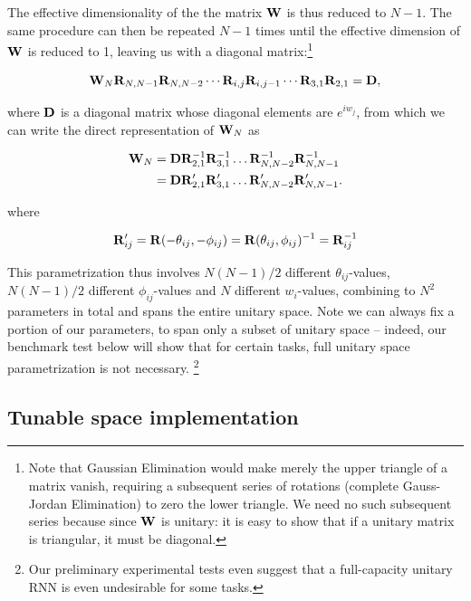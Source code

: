 The effective dimensionality of the the matrix ${\bf W}$ is thus reduced to $N-1$. The same procedure can then be repeated $N-1$ times until the effective dimension of ${\bf W}$ is reduced to 1, leaving us with a diagonal matrix:\footnote{Note that Gaussian Elimination would make merely the upper triangle of a matrix vanish, requiring a subsequent series of rotations (complete Gauss-Jordan Elimination) to zero the lower triangle. We need no such subsequent series because since ${\bf W}$ is unitary: it is easy to show that if a unitary matrix is triangular, it must be diagonal.}

\begin{equation}
{\bf W}_N{\bf R}_{N,N-1}{\bf R}_{N,N-2}\cdots{\bf R}_{i,j}{\bf R}_{i,j-1}\cdots{\bf R}_{3,1}{\bf R}_{2,1} = {\bf D},
\end{equation}

where ${\bf D}$ is a diagonal matrix whose diagonal elements are $e^{iw_j}$, from which we can write the direct representation of ${\bf W}_N$ as

\begin{eqnarray}
\label{eq:W_N}
{\bf W}_N&={\bf D}{\bf R}_{2,1}^{-1}{\bf R}_{3,1}^{-1}\dots{\bf R}_{N,N-2} ^{-1}{\bf R}_{N,N-1}^{-1}\nonumber\\
&={\bf D}{\bf R}'_{2,1}{\bf R}'_{3,1}\dots{\bf R}'_{N,N-2}{\bf R}'_{N,N-1}.
\end{eqnarray}

where

\begin{equation}{\bf R}'_{ij}={\bf R}(-\theta_{ij},-\phi_{ij})={\bf R}(\theta_{ij},\phi_{ij})^{-1}={\bf R}_{ij}^{-1}\end{equation}

This parametrization thus involves $N(N-1)/2$ different $\theta_{ij}$-values,
$N(N-1)/2$ different $\phi_{ij}$-values 
and $N$ different $w_i$-values, combining to $N^2$ parameters in total and spans the entire unitary space. Note we can always fix a portion of our parameters, to span only a subset of unitary space -- indeed, our benchmark test below will show that for certain tasks, full unitary space parametrization is not necessary. \footnote[2]{Our preliminary experimental tests even suggest that a full-capacity unitary RNN is even undesirable for some tasks.}

\subsection{Tunable space implementation}

